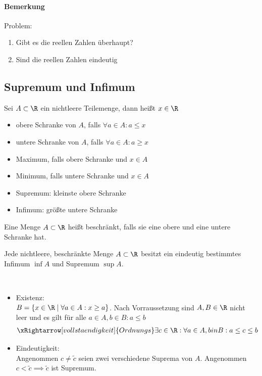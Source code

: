 \paragraph{Bemerkung} Problem:
\begin{enumerate}
	\item Gibt es die reellen Zahlen überhaupt?
	\item Sind die reellen Zahlen eindeutig
\end{enumerate}
\subsection{Supremum und Infimum}
\begin{definition}
	Sei $A\subset \R$ ein nichtleere Teilemenge, dann heißt $x \in \R$
	\begin{itemize}
		\item obere Schranke von $A$, falls $\forall a \in A: a\leq x$
		\item untere Schranke von $A$, falls $\forall a \in A: a\geq x$
		\item Maximum, falls obere Schranke und $x\in A$
		\item Minimum, falls untere Schranke und $x\in A$
		\item Supremum: kleinste obere Schranke
		\item Infimum: größte untere Schranke
	\end{itemize}
\end{definition}
\begin{definition}
	Eine Menge $A\subset\R$ heißt beschränkt, falls sie eine obere und eine untere Schranke hat.
\end{definition}
\begin{theorem}
	Jede nichtleere, beschränkte Menge $A\subset\R$ besitzt ein eindeutig bestimmtes Infimum $\inf A$ und Supremum $\sup A$.
\end{theorem}
\prove \
\begin{itemize}
	\item Existenz:\\ $B=\{x\in \R\mid \forall a \in A: x\geq a\}$. Nach Vorraussetzung
	      sind $A, B \in \R$ nicht leer und es gilt für alle $a \in A, b\in B: a \leq
		      b$\\
	      \begin{align*}
		      \xRightarrow[vollstaendigkeit]{Ordnungs} \exists c \in \R: \forall a\in A, b in B: a\leq c\leq b
	      \end{align*}
	\item Eindeutigkeit:\\ Angenommen $c\neq \tilde{c}$ seien zwei verschiedene Suprema
	      von $A$. Angenommen $c< \tilde{c}\implies \tilde{c}$ ist Supremum. \lightning
\end{itemize}
